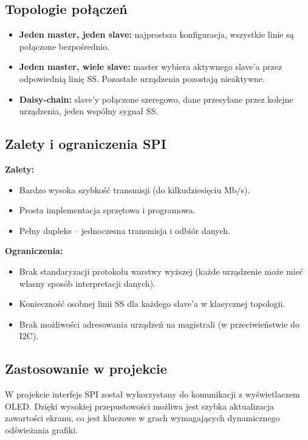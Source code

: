 \documentclass[a4paper,12pt]{report}
\begin{document}
\subsection*{Topologie połączeń}

\begin{itemize}
    \item \textbf{Jeden master, jeden slave:} najprostsza konfiguracja, wszystkie linie są połączone bezpośrednio.
    \item \textbf{Jeden master, wiele slave:} master wybiera aktywnego slave'a przez odpowiednią linię SS. Pozostałe urządzenia pozostają nieaktywne.
    \item \textbf{Daisy-chain:} slave'y połączone szeregowo, dane przesyłane przez kolejne urządzenia, jeden wspólny sygnał SS.
\end{itemize}

\subsection*{Zalety i ograniczenia SPI}

\textbf{Zalety:}
\begin{itemize}
    \item Bardzo wysoka szybkość transmisji (do kilkudziesięciu Mb/s).
    \item Prosta implementacja sprzętowa i programowa.
    \item Pełny dupleks – jednoczesna transmisja i odbiór danych.
\end{itemize}

\textbf{Ograniczenia:}
\begin{itemize}
    \item Brak standaryzacji protokołu warstwy wyższej (każde urządzenie może mieć własny sposób interpretacji danych).
    \item Konieczność osobnej linii SS dla każdego slave'a w klasycznej topologii.
    \item Brak możliwości adresowania urządzeń na magistrali (w przeciwieństwie do I2C).
\end{itemize}

\subsection*{Zastosowanie w projekcie}

W projekcie interfejs SPI został wykorzystany do komunikacji z wyświetlaczem OLED. Dzięki wysokiej przepustowości możliwa jest szybka aktualizacja zawartości ekranu, co jest kluczowe w grach wymagających dynamicznego odświeżania grafiki.
\end{document}
